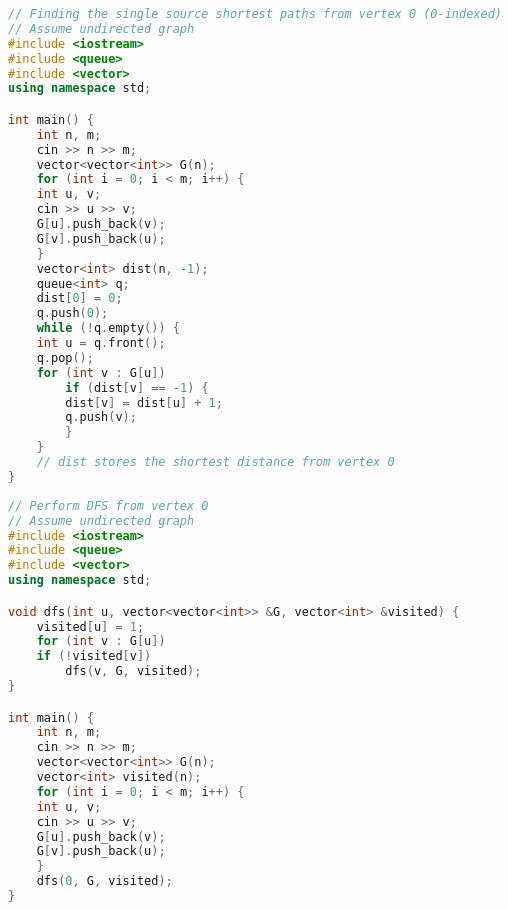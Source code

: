 \begin{lstlisting}[language=C++, caption={BFS algorithm}]
// Finding the single source shortest paths from vertex 0 (0-indexed)
// Assume undirected graph
#include <iostream>
#include <queue>
#include <vector>
using namespace std;

int main() {
    int n, m;
    cin >> n >> m;
    vector<vector<int>> G(n);
    for (int i = 0; i < m; i++) {
    int u, v;
    cin >> u >> v;
    G[u].push_back(v);
    G[v].push_back(u);
    }
    vector<int> dist(n, -1);
    queue<int> q;
    dist[0] = 0;
    q.push(0);
    while (!q.empty()) {
    int u = q.front();
    q.pop();
    for (int v : G[u])
        if (dist[v] == -1) {
        dist[v] = dist[u] + 1;
        q.push(v);
        }
    }
    // dist stores the shortest distance from vertex 0
}
\end{lstlisting}

\begin{lstlisting}[language=C++, caption={DFS algorithm}]
// Perform DFS from vertex 0
// Assume undirected graph
#include <iostream>
#include <queue>
#include <vector>
using namespace std;

void dfs(int u, vector<vector<int>> &G, vector<int> &visited) {
    visited[u] = 1;
    for (int v : G[u])
    if (!visited[v])
        dfs(v, G, visited);
}

int main() {
    int n, m;
    cin >> n >> m;
    vector<vector<int>> G(n);
    vector<int> visited(n);
    for (int i = 0; i < m; i++) {
    int u, v;
    cin >> u >> v;
    G[u].push_back(v);
    G[v].push_back(u);
    }
    dfs(0, G, visited);
}
\end{lstlisting}

